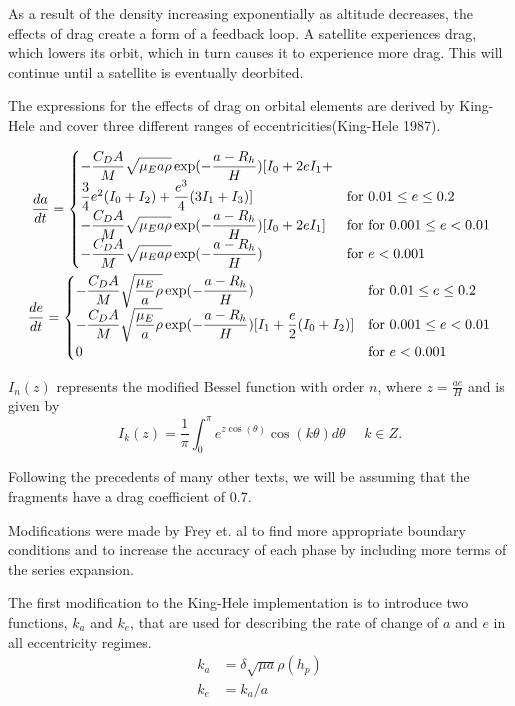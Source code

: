 \documentclass[a4paper, 12pt]{article}
\begin{document}
As a result of the density increasing exponentially as altitude decreases, the effects of drag create a form of a feedback loop. A satellite experiences drag, which lowers its orbit, which in turn causes it to experience more drag. This will continue until a satellite is eventually deorbited. 

The expressions for the effects of drag on orbital elements are derived by King-Hele and cover three different ranges of eccentricities(King-Hele 1987).

\begin{align}
		\dfrac{da}{dt} = \begin{cases}
			-\dfrac{C_D A}{M} \sqrt{\mathstrut\mu_E a \rho} \exp(-\dfrac{a - R_h}{H})[I_0 
			+ 2eI_1 + \\ \dfrac{3}{4}e^2(I_0 + I_2) + \dfrac{e^3}{4}(3I_1 +I_3)] & \text{for } 0.01 \leq e \leq 0.2 \\
			-\dfrac{C_D A}{M} \sqrt{\mathstrut\mu_E a \rho}\exp(-\dfrac{a - R_h}{H})[I_0 + 2eI_1 ] & \text{for } \text{for } 0.001 \leq e < 0.01\\
			-\dfrac{C_D A}{M} \sqrt{\mathstrut\mu_E a \rho}\exp(-\dfrac{a - R_h}{H}) & \text{for } e < 0.001
		\end{cases}\\
		\newline
		\dfrac{de}{dt} = \begin{cases}
			-\dfrac{C_D A}{M} \sqrt{\mathstrut\dfrac{\mu_E}{a} \rho}\exp(-\dfrac{a - R_h}{H}) & \text{for } 0.01 \leq e \leq 0.2  \\
			-\dfrac{C_D A}{M} \sqrt{\mathstrut\dfrac{\mu_E}{a} \rho}\exp(-\dfrac{a - R_h}{H})[I_1 + \dfrac{e}{2}(I_0 + I_2)] & \text{for } 0.001 \leq e < 0.01\\
			0 & \text{for } e < 0.001
		\end{cases}
	\end{align}

$I_n(z)$ represents the modified Bessel function with order $n$, where $z = \frac{ae}{H}$ and is given by
$$
I_k(z) = \dfrac{1}{\pi} \int_{0}^{\pi} e^{z\cos(\theta)}\cos(k\theta)d\theta \:\:\:\:\:\: k \in Z.
$$

Following the precedents of many other texts, we will be assuming that the fragments have a drag coefficient of 0.7.

Modifications were made by Frey et. al to find more appropriate boundary conditions and to increase the accuracy of each phase by including more terms of the series expansion.

The first modification to the King-Hele implementation is to introduce two functions, $k_a$  and $k_e$, that are used for describing the rate of change of $a$ and $e$ in all eccentricity regimes. \citep{frey_extension_2019}
\begin{equation*}
	\begin{aligned}
	k_a &=  \delta \sqrt{\mu a}\rho(h_p)\\
	k_e &= k_a / a
	\end{aligned}
\end{equation*}
\end{document}
